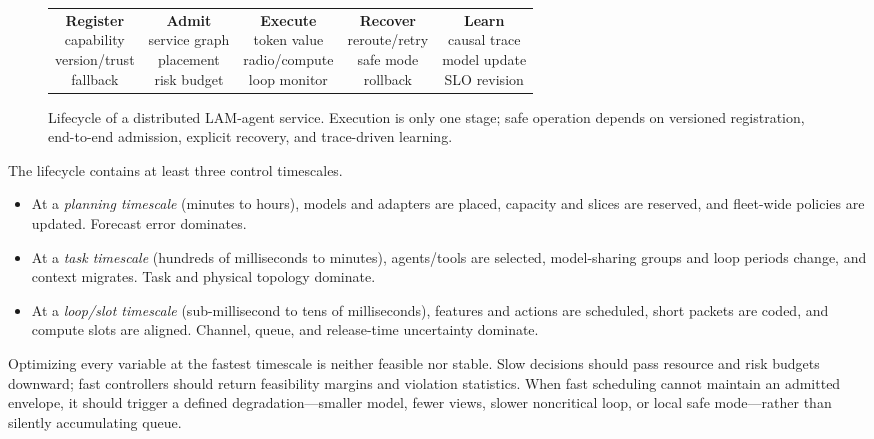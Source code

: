 \documentclass[letterpaper,journal]{IEEEtran}
\begin{document}
\begin{figure}[t]
\centering
\setlength{\tabcolsep}{2.2pt}
\renewcommand{\arraystretch}{1.05}
\begin{tabular}{c@{\,$\rightarrow$\,}c@{\,$\rightarrow$\,}c@{\,$\rightarrow$\,}c@{\,$\rightarrow$\,}c}
\fbox{\parbox[c][0.78in][c]{0.15\textwidth}{\centering\textbf{Register}\\
capability\\version/trust\\fallback}}
&
\fbox{\parbox[c][0.78in][c]{0.15\textwidth}{\centering\textbf{Admit}\\
service graph\\placement\\risk budget}}
&
\fbox{\parbox[c][0.78in][c]{0.15\textwidth}{\centering\textbf{Execute}\\
token value\\radio/compute\\loop monitor}}
&
\fbox{\parbox[c][0.78in][c]{0.15\textwidth}{\centering\textbf{Recover}\\
reroute/retry\\safe mode\\rollback}}
&
\fbox{\parbox[c][0.78in][c]{0.15\textwidth}{\centering\textbf{Learn}\\
causal trace\\model update\\SLO revision}}
\end{tabular}
\caption{Lifecycle of a distributed LAM-agent service. Execution is only one
stage; safe operation depends on versioned registration, end-to-end admission,
explicit recovery, and trace-driven learning.}
\label{fig:lifecycle}
\end{figure}

The lifecycle contains at least three control timescales.
\begin{itemize}
\item At a \emph{planning timescale} (minutes to hours), models and adapters
are placed, capacity and slices are reserved, and fleet-wide policies are
updated. Forecast error dominates.
\item At a \emph{task timescale} (hundreds of milliseconds to minutes),
agents/tools are selected, model-sharing groups and loop periods change, and
context migrates. Task and physical topology dominate.
\item At a \emph{loop/slot timescale} (sub-millisecond to tens of
milliseconds), features and actions are scheduled, short packets are coded,
and compute slots are aligned. Channel, queue, and release-time uncertainty
dominate.
\end{itemize}
Optimizing every variable at the fastest timescale is neither feasible nor
stable. Slow decisions should pass resource and risk budgets downward; fast
controllers should return feasibility margins and violation statistics.
When fast scheduling cannot maintain an admitted envelope, it should trigger
a defined degradation---smaller model, fewer views, slower noncritical loop,
or local safe mode---rather than silently accumulating queue.
\end{document}
